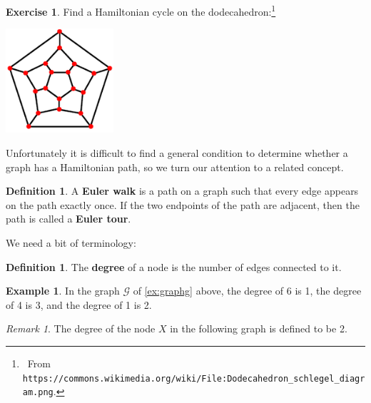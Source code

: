 \documentclass[a4paper]{amsart}
\theoremstyle{definition}
\newtheorem{defn}[thm]{Definition}
\newtheorem{ex}[thm]{Example}
\newtheorem{exercise}[thm]{Exercise}
\theoremstyle{remark}
\newtheorem{rem}[thm]{Remark}
\begin{document}
\begin{exercise}
  Find a Hamiltonian cycle on the dodecahedron:\footnote{~From \texttt{https://commons.wikimedia.org/wiki/File:Dodecahedron\_schlegel\_diagram.png}.}
  \begin{center}
    \includegraphics[width=0.3\textwidth]{dodec}
  \end{center}
\end{exercise}

Unfortunately it is difficult to find a general condition to determine whether a graph has a Hamiltonian path, so we turn
our attention to a related concept.

\begin{defn}
  A \textbf{Euler walk} is a path on a graph such that every edge appears on the path exactly once. If the two endpoints
  of the path are adjacent, then the path is called a \textbf{Euler tour}.
\end{defn}

We need a bit of terminology:

\begin{defn}
  The \textbf{degree} of a node is the number of edges connected to it.
\end{defn}

\begin{ex}
  In the graph $ \mathcal{G} $ of \cref{ex:graphg} above, the degree of 6 is 1, the degree of 4 is 3, and the degree of 1 is 2.
\end{ex}

\begin{rem}
  The degree of the node $ X $ in the following graph is defined to be 2.
  \begin{center}
  \end{center}
\end{rem}
\end{document}
